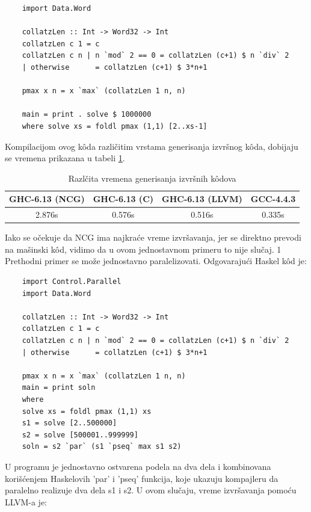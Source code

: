 \begin{verbatim}
	import Data.Word
	
	collatzLen :: Int -> Word32 -> Int
	collatzLen c 1 = c
	collatzLen c n | n `mod` 2 == 0 = collatzLen (c+1) $ n `div` 2
	| otherwise      = collatzLen (c+1) $ 3*n+1
	
	pmax x n = x `max` (collatzLen 1 n, n)
	
	main = print . solve $ 1000000
	where solve xs = foldl pmax (1,1) [2..xs-1]
\end{verbatim}

Kompilacijom ovog k\^{o}da različitim vrstama generisanja izvršnog k\^{o}da, dobijaju se vremena prikazana u tabeli \ref{tab:vremena}.

\begin{table}[h!]
	\begin{center}
		\caption{Razlčita vremena generisanja izvršnih k\^{o}dova}
		\begin{tabular}{||c|c|c|c||} \hline
			GHC-6.13 (NCG) & GHC-6.13 (C) & GHC-6.13 (LLVM) & GCC-4.4.3 \\ \hline
			2.876s & 0.576s & 0.516s & 0.335s \\ \hline
		\end{tabular}
		\label{tab:vremena}
	\end{center}
\end{table}


Iako se očekuje da NCG  ima najkraće vreme izvršavanja, jer se direktno prevodi na mašinski k\^{o}d, vidimo da u ovom jednostavnom primeru to nije slučaj. 1
Prethodni primer se može jednostavno paralelizovati. Odgovarajući Haskel k\^{o}d je:

\begin{verbatim}
	import Control.Parallel
	import Data.Word
	
	collatzLen :: Int -> Word32 -> Int
	collatzLen c 1 = c
	collatzLen c n | n `mod` 2 == 0 = collatzLen (c+1) $ n `div` 2
	| otherwise      = collatzLen (c+1) $ 3*n+1
	
	pmax x n = x `max` (collatzLen 1 n, n)
	main = print soln
	where
	solve xs = foldl pmax (1,1) xs
	s1 = solve [2..500000]
	s2 = solve [500001..999999]
	soln = s2 `par` (s1 `pseq` max s1 s2)
\end{verbatim}

U programu je jednostavno ostvarena podela na dva dela i kombinovana korišćenjem Haskelovih 'par' i 'pseq' funkcija, koje ukazuju kompajleru da paralelno realizuje dva dela s1 i s2. U ovom slučaju, vreme izvršavanja pomoću LLVM-a je:

